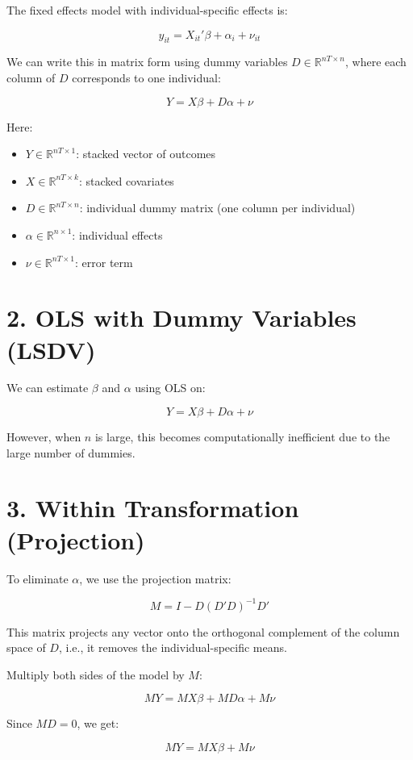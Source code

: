 \documentclass[12pt, oneside]{article}
\begin{document}
The fixed effects model with individual-specific effects is:

\[
y_{it} = X_{it}' \beta + \alpha_i + \nu_{it}
\]

We can write this in matrix form using dummy variables \( D \in \mathbb{R}^{nT \times n} \), where each column of \( D \) corresponds to one individual:

\[
Y = X \beta + D \alpha + \nu
\]

Here:
\begin{itemize}
  \item \( Y \in \mathbb{R}^{nT \times 1} \): stacked vector of outcomes
  \item \( X \in \mathbb{R}^{nT \times k} \): stacked covariates
  \item \( D \in \mathbb{R}^{nT \times n} \): individual dummy matrix (one column per individual)
  \item \( \alpha \in \mathbb{R}^{n \times 1} \): individual effects
  \item \( \nu \in \mathbb{R}^{nT \times 1} \): error term
\end{itemize}

\section*{2. OLS with Dummy Variables (LSDV)}

We can estimate \( \beta \) and \( \alpha \) using OLS on:

\[
Y = X \beta + D \alpha + \nu
\]

However, when \( n \) is large, this becomes computationally inefficient due to the large number of dummies.

\section*{3. Within Transformation (Projection)}

To eliminate \( \alpha \), we use the projection matrix:

\[
M = I - D(D'D)^{-1}D'
\]

This matrix projects any vector onto the orthogonal complement of the column space of \( D \), i.e., it removes the individual-specific means.

Multiply both sides of the model by \( M \):

\[
MY = MX \beta + MD \alpha + M \nu
\]

Since \( MD = 0 \), we get:

\[
MY = MX \beta + M \nu
\]
\end{document}
